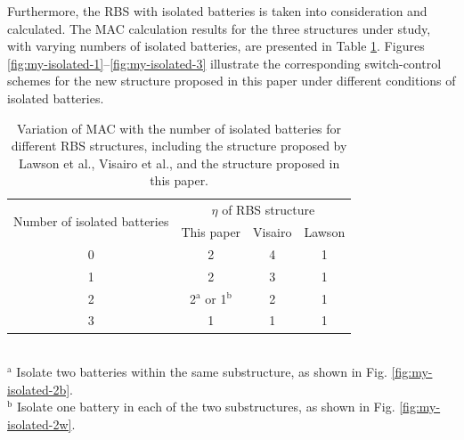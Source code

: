 \documentclass{article}
\begin{document}
Furthermore, the RBS with isolated batteries is taken into consideration and calculated. 
The MAC calculation results for the three structures under study, with varying numbers of isolated batteries, are presented in Table \ref{tab:isolated_mac}. 
Figures \ref{fig:my-isolated-1}--\ref{fig:my-isolated-3} illustrate the corresponding switch-control schemes for the new structure proposed in this paper under different conditions of isolated batteries.

\begin{table}[htbp]
    \centering
    \caption{
      Variation of MAC with the number of isolated batteries for different RBS structures, including the structure proposed by Lawson et al., Visairo et al., and the structure proposed in this paper.
      }
      \label{tab:isolated_mac}
      \begin{tabular}{cccc}
      \toprule
      \multirow{2}[4]{*}{Number of isolated batteries} & \multicolumn{3}{c}{$\eta$ of RBS structure} \\
  \cmidrule{2-4}          & This paper  & Visairo  & Lawson  \\
      \midrule
      0     & 2     & 4     & 1 \\
      1     & 2     & 3     & 1 \\
      2     & 2$^{\mathrm{a}}$ or 1$^{\mathrm{b}}$ & 2     & 1 \\
      3     & 1     & 1     & 1 \\
      \bottomrule
      \end{tabular}
      \\
      \footnotesize{$^{\mathrm{a}}$ Isolate two batteries within the same substructure, as shown in Fig. \ref{fig:my-isolated-2b}.}\\
      \footnotesize{$^{\mathrm{b}}$ Isolate one battery in each of the two substructures, as shown in Fig. \ref{fig:my-isolated-2w}.}
  \end{table}
  
\end{document}
